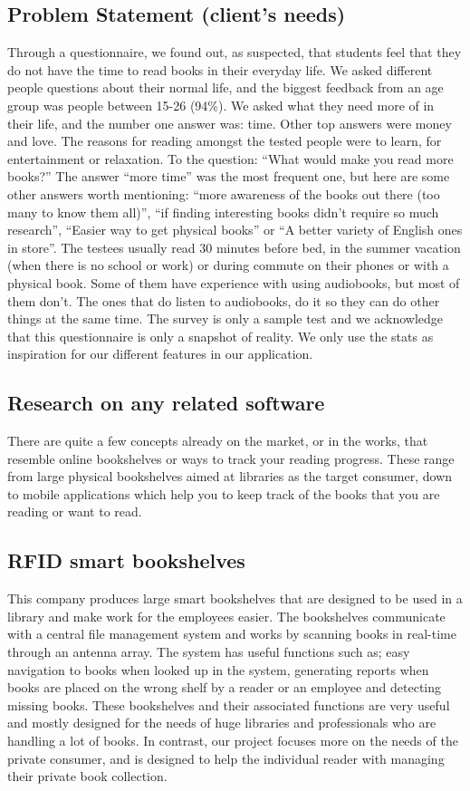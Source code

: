 \documentclass[conference]{IEEEtran}
\begin{document}
\subsection*{Problem Statement (client's needs)}
Through a questionnaire, we found out, as suspected, that students feel that they do not have the time to read books in their everyday life. We asked different people questions about their normal life, and the biggest feedback from an age group was people between 15-26 (94\%). We asked what they need more of in their life, and the number one answer was: time. Other top answers were money and love. The reasons for reading amongst the tested people were to learn, for entertainment or relaxation. To the question: “What would make you read more books?” The answer “more time” was the most frequent one, but here are some other answers worth mentioning: “more awareness of the books out there (too many to know them all)”, “if finding interesting books didn’t require so much research”, “Easier way to get physical books” or “A better variety of English ones in store”. The testees usually read 30 minutes before bed, in the summer vacation (when there is no school or work) or during commute on their phones or with a physical book. Some of them have experience with using audiobooks, but most of them don't. The ones that do listen to audiobooks, do it so they can do other things at the same time.
The survey is only a sample test and we acknowledge that this questionnaire is only a snapshot of reality. We only use the stats as inspiration for our different features in our application.


\subsection*{Research on any related software}
There are quite a few concepts already on the market, or in the works, that resemble online bookshelves or ways to track your reading progress. These range from large physical bookshelves aimed at libraries as the target consumer, down to mobile applications which help you to keep track of the books that you are reading or want to read.\\

\subsection{RFID smart bookshelves} 
This company produces large smart bookshelves that are designed to be used in a library and make work for the employees easier. The bookshelves communicate with a central file management system and works by scanning books in real-time through an antenna array. The system has useful functions such as; easy navigation to books when looked up in the system, generating reports when books are placed on the wrong shelf by a reader or an employee and detecting missing books. These bookshelves and their associated functions are very useful and mostly designed for the needs of huge libraries and professionals who are handling a lot of books. In contrast, our project focuses more on the needs of the private consumer, and is designed to help the individual reader with managing their private book collection.\cite{RFID} \\
\end{document}

